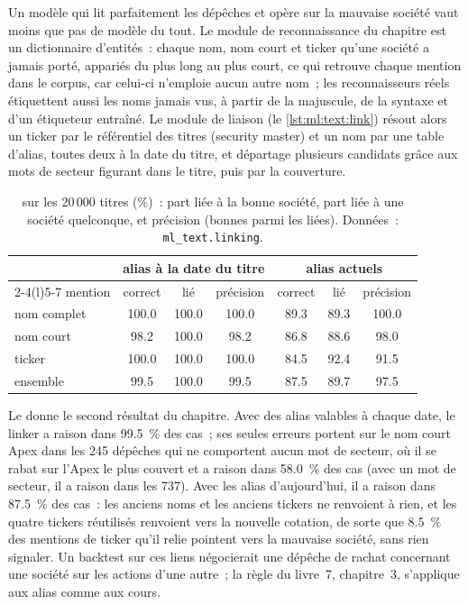 Un modèle qui lit parfaitement les dépêches et opère sur la mauvaise société vaut moins que pas de modèle du tout. Le module de reconnaissance du chapitre est un
dictionnaire d'entités~: chaque nom, nom court et ticker qu'une société a jamais porté, appariés du plus long au plus court, ce qui retrouve chaque mention dans le
corpus, car celui-ci n'emploie aucun autre nom~; les reconnaisseurs réels étiquettent aussi les noms jamais vus, à partir de la majuscule,
de la syntaxe et d'un étiqueteur entraîné. Le module de liaison (le \cref{lst:ml:text:link}) résout alors un ticker par le référentiel des titres (security master) et
un nom par une table d'alias, toutes deux à la date du titre, et départage plusieurs candidats grâce aux mots de secteur figurant dans le
titre, puis par la couverture.

\begin{table}[htbp]
\centering\small
\begin{tabular}{@{}lcccccc@{}}
\toprule
& \multicolumn{3}{c}{alias à la date du titre} & \multicolumn{3}{c}{alias actuels}\\
\cmidrule(lr){2-4}\cmidrule(l){5-7}
mention & correct & lié & précision & correct & lié & précision\\
\midrule
nom complet & 100.0 & 100.0 & 100.0 & 89.3 & 89.3 & 100.0\\
nom court & 98.2 & 100.0 & 98.2 & 86.8 & 88.6 & 98.0\\
ticker & 100.0 & 100.0 & 100.0 & 84.5 & 92.4 & 91.5\\
\midrule
ensemble & 99.5 & 100.0 & 99.5 & 87.5 & 89.7 & 97.5\\
\bottomrule
\end{tabular}
\caption{ sur les 20\,000 titres (\%)~: part liée à la bonne société, part liée à une société quelconque, et
précision (bonnes parmi les liées). Données~: \texttt{ml\_text.linking}.}\label{tab:ml:text:linking}
\end{table}

Le  donne le second résultat du chapitre. Avec des alias valables à chaque date, le linker a raison dans 99.5~\%
des cas~; ses seules erreurs portent sur le nom court Apex dans les 245 dépêches qui ne comportent aucun mot de secteur, où il se rabat
sur l'Apex le plus couvert et a raison dans 58.0~\% des cas (avec un mot de secteur, il a raison dans les 737). Avec les alias d'aujourd'hui,
il a raison dans 87.5~\% des cas~: les anciens noms et les anciens tickers ne renvoient à rien, et les quatre tickers réutilisés renvoient vers la nouvelle cotation,
de sorte que 8.5~\% des mentions de ticker qu'il relie pointent vers la mauvaise société, sans rien signaler. Un backtest sur ces liens négocierait
une dépêche de rachat concernant une société sur les actions d'une autre~; la règle du livre~7, chapitre~3, s'applique aux alias comme aux
cours.

